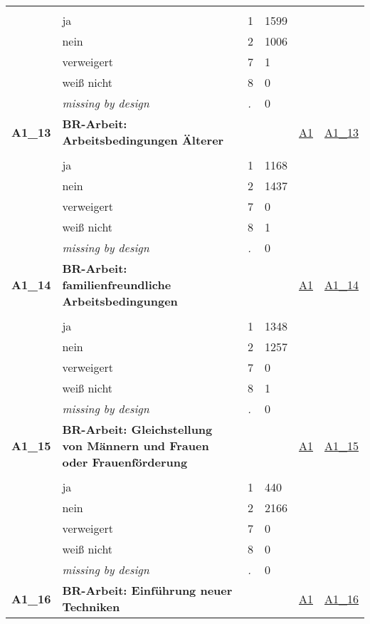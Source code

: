 \begin{longtable}{| L{2.45cm} | L{6cm} | C{1.5cm} | R{1cm} | C{2.25cm} | C{2.25cm} |}
   &  &  &  &  &  \\ 
   & ja & 1 & 1599 &  &  \\ 
   & nein & 2 & 1006 &  &  \\ 
   & verweigert & 7 & 1 &  &  \\ 
   & weiß nicht & 8 & 0 &  &  \\ 
   & \textit{missing by design} & \textit{.} & 0 &  &  \\ 
   \midrule
\textbf{A1\_13}\label{var:A1:13} & \textbf{BR-Arbeit: Arbeitsbedingungen Älterer} &  &  & \hyperref[A1]{A1} & \hyperref[var:suf:A1:13]{A1\_13} \\ 
   &  &  &  &  &  \\ 
   & ja & 1 & 1168 &  &  \\ 
   & nein & 2 & 1437 &  &  \\ 
   & verweigert & 7 & 0 &  &  \\ 
   & weiß nicht & 8 & 1 &  &  \\ 
   & \textit{missing by design} & \textit{.} & 0 &  &  \\ 
   \midrule
\textbf{A1\_14}\label{var:A1:14} & \textbf{BR-Arbeit: familienfreundliche Arbeitsbedingungen} &  &  & \hyperref[A1]{A1} & \hyperref[var:suf:A1:14]{A1\_14} \\ 
   &  &  &  &  &  \\ 
   & ja & 1 & 1348 &  &  \\ 
   & nein & 2 & 1257 &  &  \\ 
   & verweigert & 7 & 0 &  &  \\ 
   & weiß nicht & 8 & 1 &  &  \\ 
   & \textit{missing by design} & \textit{.} & 0 &  &  \\ 
   \midrule
\textbf{A1\_15}\label{var:A1:15} & \textbf{BR-Arbeit: Gleichstellung von Männern und Frauen oder Frauenförderung} &  &  & \hyperref[A1]{A1} & \hyperref[var:suf:A1:15]{A1\_15} \\ 
   &  &  &  &  &  \\ 
   & ja & 1 & 440 &  &  \\ 
   & nein & 2 & 2166 &  &  \\ 
   & verweigert & 7 & 0 &  &  \\ 
   & weiß nicht & 8 & 0 &  &  \\ 
   & \textit{missing by design} & \textit{.} & 0 &  &  \\ 
   \midrule
\textbf{A1\_16}\label{var:A1:16} & \textbf{BR-Arbeit: Einführung neuer Techniken} &  &  & \hyperref[A1]{A1} & \hyperref[var:suf:A1:16]{A1\_16} \\ 

\end{longtable}
